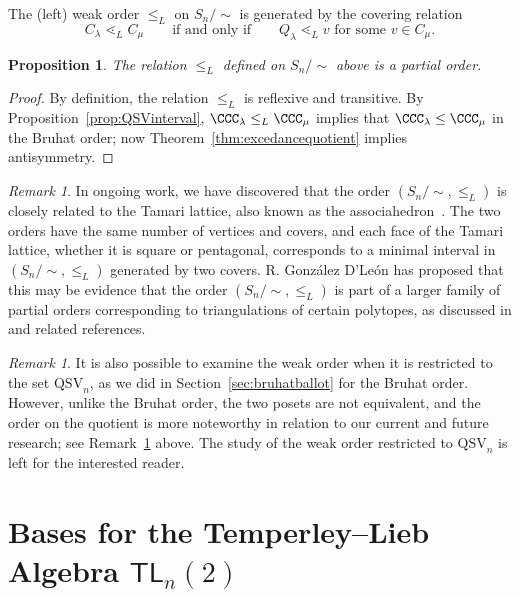 \documentclass[12pt]{amsart}
\newtheorem{prop}[equation]{Proposition}
\theoremstyle{definition}
\theoremstyle{remark}
\newtheorem{rem}[equation]{Remark}
\numberwithin{equation}{section}
\newcommand{\TL}{\mathsf{TL}}
\newcommand{\QSV}{\mathrm{QSV}}
\begin{document}
The (left) weak order $\le_{L}$ on $S_n\big/\!\!\sim$ is generated by the  covering relation
\[
C_{\lambda} \lessdot_{L} C_{\mu} \qquad\text{if and only if}\qquad  \text{$Q_\lambda \lessdot_{L} v$ for some  $v \in C_{\mu}$.}
\]

\begin{prop}
The relation $\le_{L}$ defined on $S_{n}/\!\!\sim$ above is a partial order.
\end{prop}
\begin{proof}
By definition, the relation $\le_{L}$ is reflexive and transitive.  By Proposition~\ref{prop:QSVinterval}, $\CCC_{\lambda} \le_{L} \CCC_{\mu}$ implies that $\CCC_{\lambda} \le \CCC_{\mu}$ in the Bruhat order; now Theorem~\ref{thm:excedancequotient} implies antisymmetry.
\end{proof}

\begin{rem}
\label{rem:tamari}
In ongoing work, we have discovered that the order $(S_{n}/\!\!\sim,\le_{L})$ is closely related to the Tamari lattice, also known as the associahedron~\cite{Tamari}. 
The two orders have the same number of vertices and covers, and each face of the Tamari lattice, whether it is square or pentagonal, corresponds to a minimal interval in $(S_{n}/\!\!\sim,\le_{L})$ generated by two covers.
R. González D'León has proposed that this may be evidence that the order $(S_{n}/\!\!\sim,\le_{L})$ is part of a larger family of partial orders corresponding to triangulations of certain polytopes, as discussed in \cite{vBGMFY} and related references.
\end{rem}
 
 \begin{rem} 
It is also possible to examine the weak order when it is restricted to the set $\QSV_n$, as we did in Section~\ref{sec:bruhatballot} for the Bruhat order. 
However, unlike the Bruhat order, the two posets are not equivalent, and the order on the quotient is more noteworthy in relation to our current and future research; see Remark~\ref{rem:tamari} above. 
The study of the weak order restricted to $\QSV_n$ is left for the interested reader. 
\end{rem}


\section{Bases for the Temperley--Lieb Algebra $\TL_{n}(2)$}
\label{sec:TLbasis}
\end{document}
